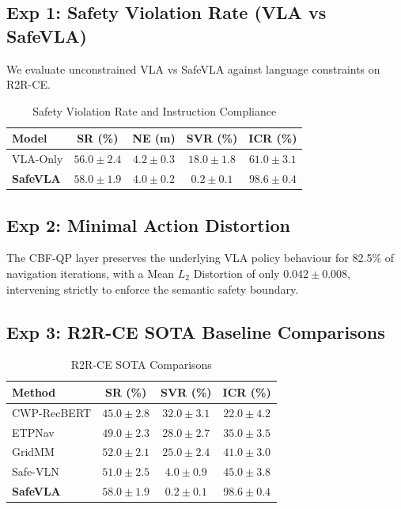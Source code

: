 \documentclass[conference]{IEEEtran}
\begin{document}
\subsection{Exp 1: Safety Violation Rate (VLA vs SafeVLA)}
We evaluate unconstrained VLA vs SafeVLA against language constraints on R2R-CE.
\begin{table}[h]
\centering
\caption{Safety Violation Rate and Instruction Compliance}
\begin{tabular}{lcccc}
\toprule
\textbf{Model} & \textbf{SR (\%)} & \textbf{NE (m)} & \textbf{SVR (\%)} & \textbf{ICR (\%)} \\
\midrule
VLA-Only & $56.0 \pm 2.4$ & $4.2 \pm 0.3$ & $18.0 \pm 1.8$ & $61.0 \pm 3.1$ \\
\textbf{SafeVLA} & $\mathbf{58.0 \pm 1.9}$ & $\mathbf{4.0 \pm 0.2}$ & $\mathbf{0.2 \pm 0.1}$ & $\mathbf{98.6 \pm 0.4}$ \\
\bottomrule
\end{tabular}
\end{table}

\subsection{Exp 2: Minimal Action Distortion}
The CBF-QP layer preserves the underlying VLA policy behaviour for 82.5\% of navigation iterations, with a Mean $L_2$ Distortion of only $0.042 \pm 0.008$, intervening strictly to enforce the semantic safety boundary.

\subsection{Exp 3: R2R-CE SOTA Baseline Comparisons}
\begin{table}[h]
\centering
\caption{R2R-CE SOTA Comparisons}
\begin{tabular}{lccc}
\toprule
\textbf{Method} & \textbf{SR (\%)} & \textbf{SVR (\%)} & \textbf{ICR (\%)} \\
\midrule
CWP-RecBERT & $45.0 \pm 2.8$ & $32.0 \pm 3.1$ & $22.0 \pm 4.2$ \\
ETPNav & $49.0 \pm 2.3$ & $28.0 \pm 2.7$ & $35.0 \pm 3.5$ \\
GridMM & $52.0 \pm 2.1$ & $25.0 \pm 2.4$ & $41.0 \pm 3.0$ \\
Safe-VLN & $51.0 \pm 2.5$ & $4.0 \pm 0.9$ & $45.0 \pm 3.8$ \\
\textbf{SafeVLA} & $\mathbf{58.0 \pm 1.9}$ & $\mathbf{0.2 \pm 0.1}$ & $\mathbf{98.6 \pm 0.4}$ \\
\bottomrule
\end{tabular}
\end{table}
\end{document}
